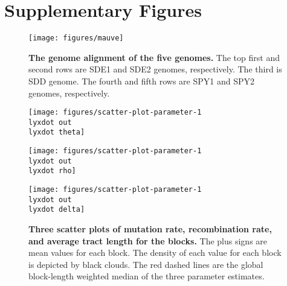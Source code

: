 \documentclass[10pt]{article}
\newcommand{\lyxdot}{.}
\begin{document}
\clearpage{}
\section*{Supplementary Figures}

\begin{figure}[!ht]
\begin{center}
\texttt{[image: figures/mauve]}
\end{center}
\caption{\label{fig:mauve}
{\bf The genome alignment of the five genomes.} The top
first and second rows are SDE1 and SDE2 genomes, respectively. The third is SDD
genome. The fourth and fifth rows are SPY1 and SPY2 genomes, respectively.}
\end{figure}
\clearpage{}


\begin{figure}[!ht]
\begin{center}
\texttt{[image: figures/scatter-plot-parameter-1\\lyxdot out\\lyxdot theta]}

\texttt{[image: figures/scatter-plot-parameter-1\\lyxdot out\\lyxdot rho]}

\texttt{[image: figures/scatter-plot-parameter-1\\lyxdot out\\lyxdot delta]}
\end{center}
\caption{
{\bf Three scatter plots of mutation rate, recombination
rate, and average tract length for the blocks.} The plus signs are mean values
for each block. The density of each value for each block is depicted by black
clouds.  The red dashed lines are the global block-length weighted median of the
three parameter estimates.}
\end{figure}
\label{fig:scatter3}
\clearpage{}%
\end{document}
